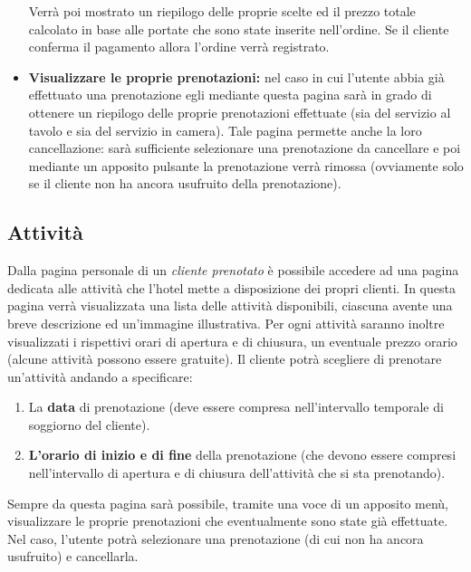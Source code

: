 \documentclass [a4paper, 12pt]{book}
\begin{document}
\begin{itemize}
\begin{enumerate}
\end{enumerate}
Verrà poi mostrato un riepilogo delle proprie scelte ed il prezzo totale calcolato in base alle portate che sono state inserite nell'ordine. Se il cliente conferma il pagamento allora l'ordine verrà registrato.
\item \textbf{Visualizzare le proprie prenotazioni:} nel caso in cui l'utente abbia già effettuato una prenotazione egli mediante questa pagina sarà in grado di ottenere un riepilogo delle proprie prenotazioni effettuate (sia del servizio al tavolo e sia del servizio in camera). Tale pagina permette anche la loro cancellazione: sarà sufficiente selezionare una prenotazione da cancellare e poi mediante un apposito pulsante la prenotazione verrà rimossa (ovviamente solo se il cliente non ha ancora usufruito della prenotazione).
\end{itemize} 

\medskip

\subsection{Attività}
\label{Attività}
Dalla pagina personale di un \textit{cliente prenotato} è possibile accedere ad una pagina dedicata alle attività che l'hotel mette a disposizione dei propri clienti. In questa pagina verrà visualizzata una lista delle attività disponibili, ciascuna avente una breve descrizione ed un'immagine illustrativa. Per ogni attività saranno inoltre visualizzati i rispettivi orari di apertura e di chiusura, un eventuale prezzo orario (alcune attività possono essere gratuite). Il cliente potrà scegliere di prenotare un'attività andando a specificare:
\begin{enumerate}
\item La \textbf{data} di prenotazione (deve essere compresa nell'intervallo temporale di soggiorno del cliente).
\item \textbf{L'orario di inizio e di fine} della prenotazione (che devono essere compresi nell'intervallo di apertura e di chiusura dell'attività che si sta prenotando).
\end{enumerate}
Sempre da questa pagina sarà possibile, tramite una voce di un apposito menù,  visualizzare le proprie prenotazioni che eventualmente sono state già effettuate. Nel caso, l'utente potrà selezionare una prenotazione (di cui non ha ancora usufruito) e cancellarla.

\medskip
\end{document}
